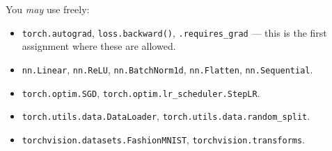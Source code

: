 \documentclass[11pt]{article}
\newcommand{\code}[1]{\texttt{\small #1}}
\begin{document}
You \emph{may} use freely:
\begin{itemize}
    \item \code{torch.autograd}, \code{loss.backward()}, \code{.requires\_grad}
          --- this is the first assignment where these are allowed.
    \item \code{nn.Linear}, \code{nn.ReLU}, \code{nn.BatchNorm1d},
          \code{nn.Flatten}, \code{nn.Sequential}.
    \item \code{torch.optim.SGD}, \code{torch.optim.lr\_scheduler.StepLR}.
    \item \code{torch.utils.data.DataLoader}, \code{torch.utils.data.random\_split}.
    \item \code{torchvision.datasets.FashionMNIST}, \code{torchvision.transforms}.
\end{itemize}
\end{document}
